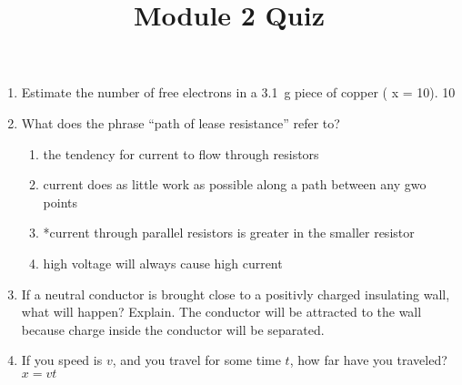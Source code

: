 \documentclass[letterpaper,10pt]{article}
\title{Module 2 Quiz}
\begin{document}
\maketitle

\begin{enumerate}
    \item Estimate the number of free electrons in a \SI{3.1}{\gram} piece of copper ( x = 10).
    \vspace{1in}
    10 %
    \vspace{1in}
    \item What does the phrase ``path of lease resistance'' refer to?
    \begin{enumerate}
        \item the tendency for current to flow through resistors
        \item current does as little work as possible along a path between any gwo points
        \item *current through parallel resistors is greater in the smaller resistor
        \item high voltage will always cause high current
    \end{enumerate}
    \item If a neutral conductor is brought close to a positivly charged insulating wall, what will happen? Explain.
    \vspace{1in}
    The conductor will be attracted to the wall because charge inside the conductor will be separated.
    \vspace{1in}
    \item If you speed is $v$, and you travel for some time $t$, how far have you traveled?
    \vspace{1in}
    $x = vt$
    \vspace{1in}
\end{enumerate}
\end{document}
